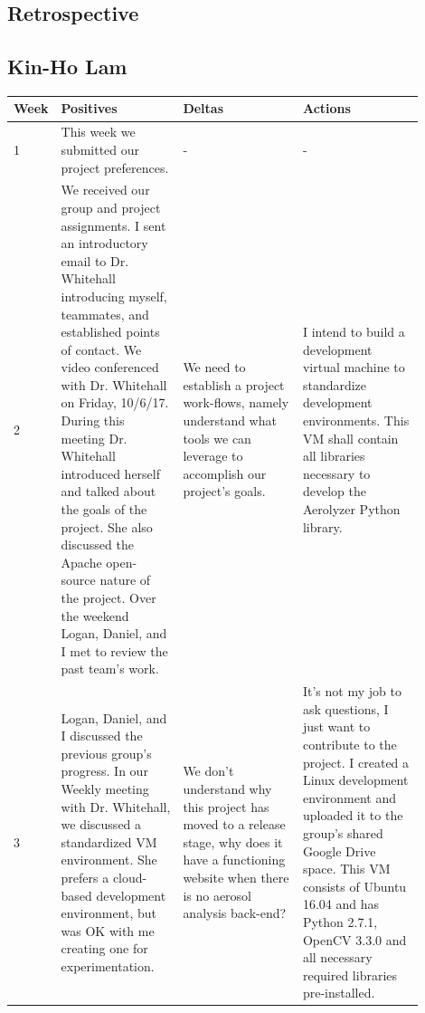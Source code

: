 \documentclass[onecolumn, draftclsnofoot,10pt, compsoc]{IEEEtran}
\begin{document}
\begin{singlespace}
	\section{Retrospective}
		\subsection{Kin-Ho Lam}
		\begin{longtable}{|l|p{0.3\linewidth}|p{0.3\linewidth}|p{0.3\linewidth}|}\hline \textbf{Week} & \textbf{Positives} & \textbf{Deltas} & \textbf{Actions}\\\hline
		1 	& This week we submitted our project preferences. & - & -\\\hline

		2 	&
			We received our group and project assignments. I sent an introductory email to Dr. Whitehall introducing myself, teammates, and established points of contact.
			We video conferenced with Dr. Whitehall on Friday, 10/6/17.
			During this meeting Dr. Whitehall introduced herself and talked about the goals of the project.
			She also discussed the Apache open-source nature of the project.
			Over the weekend Logan, Daniel, and I met to review the past team's work.
			&
			We need to establish a project work-flows, namely understand what tools we can leverage to accomplish our project's goals. 
			&
			I intend to build a development virtual machine to standardize development environments.
			This VM shall contain all libraries necessary to develop the Aerolyzer Python library.
			\\\hline

		3	&
			Logan, Daniel, and I discussed the previous group's progress.
			In our Weekly meeting with Dr. Whitehall, we discussed a standardized VM environment.
			She prefers a cloud-based development environment, but was OK with me creating one for experimentation.
			&
			We don't understand why this project has moved to a release stage, why does it have a functioning website when there is no aerosol analysis back-end?
			&
			It's not my job to ask questions, I just want to contribute to the project.
			I created a Linux development environment and uploaded it to the group's shared Google Drive space.
			This VM consists of Ubuntu 16.04 and has Python 2.7.1, OpenCV 3.3.0 and all necessary required libraries pre-installed.
			\\\hline


\end{longtable}
\end{singlespace}
\end{document}
